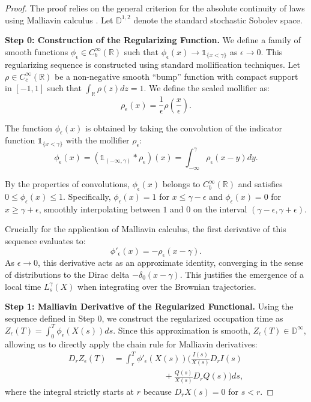 \documentclass[11pt]{article}
\begin{document}
\begin{proof}
The proof relies on the general criterion for the absolute continuity of laws using Malliavin calculus \citet{nualart2006malliavin}. Let $\mathbb{D}^{1,2}$ denote the standard stochastic Sobolev space. 

\textbf{Step 0: Construction of the Regularizing Function.} 
We define a family of smooth functions $\phi_\epsilon \in C_b^\infty(\mathbb{R})$ such that $\phi_\epsilon(x) \to \mathds{1}_{\{x < \gamma\}}$ as $\epsilon \to 0$. This regularizing sequence is constructed using standard mollification techniques. Let $\rho \in C_c^\infty(\mathbb{R})$ be a non-negative smooth ``bump'' function with compact support in $[-1, 1]$ such that $\int_{\mathbb{R}} \rho(z) dz = 1$. We define the scaled mollifier as:
\begin{equation}
    \rho_\epsilon(x) = \frac{1}{\epsilon}\rho\left(\frac{x}{\epsilon}\right).
\end{equation}

The function $\phi_\epsilon(x)$ is obtained by taking the convolution of the indicator function $\mathds{1}_{\{x < \gamma\}}$ with the mollifier $\rho_\epsilon$:
\begin{equation}
    \phi_\epsilon(x) = \left(\mathds{1}_{(-\infty, \gamma)} * \rho_\epsilon\right)(x) = \int_{-\infty}^\gamma \rho_\epsilon(x - y) dy.
\end{equation}

By the properties of convolutions, $\phi_\epsilon(x)$ belongs to $C_b^\infty(\mathbb{R})$ and satisfies $0 \leq \phi_\epsilon(x) \leq 1$. Specifically, $\phi_\epsilon(x) = 1$ for $x \leq \gamma - \epsilon$ and $\phi_\epsilon(x) = 0$ for $x \geq \gamma + \epsilon$, smoothly interpolating between $1$ and $0$ on the interval $(\gamma - \epsilon, \gamma + \epsilon)$. 

Crucially for the application of Malliavin calculus, the first derivative of this sequence evaluates to:
\begin{equation}
    \phi'_\epsilon(x) = -\rho_\epsilon(x - \gamma).
\end{equation}
As $\epsilon \to 0$, this derivative acts as an approximate identity, converging in the sense of distributions to the Dirac delta $-\delta_0(x - \gamma)$. This justifies the emergence of a local time $L_s^\gamma(X)$ when integrating over the Brownian trajectories.

\textbf{Step 1: Malliavin Derivative of the Regularized Functional.} 
Using the sequence defined in Step 0, we construct the regularized occupation time as $Z_\epsilon(T) = \int_0^T \phi_\epsilon(X(s)) ds$. Since this approximation is smooth, $Z_\epsilon(T) \in \mathbb{D}^\infty$, allowing us to directly apply the chain rule for Malliavin derivatives:
\begin{align}
    D_r Z_\epsilon(T) &= \int_r^T \phi'_\epsilon(X(s))\Bigg( \frac{I(s)}{X(s)} D_r I(s)  \nonumber\\
    &\qquad \qquad\qquad + \frac{Q(s)}{X(s)} D_r Q(s) \Bigg) ds,
\end{align}
where the integral strictly starts at $r$ because $D_r X(s) = 0$ for $s < r$.


\end{proof}
\end{document}
